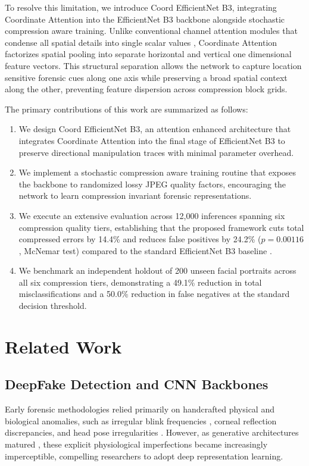 \documentclass[conference]{IEEEtran}
\begin{document}
To resolve this limitation, we introduce Coord EfficientNet B3, integrating Coordinate Attention \cite{hou2021coordinate} into the EfficientNet B3 backbone alongside stochastic compression aware training. Unlike conventional channel attention modules that condense all spatial details into single scalar values \cite{hu2018squeeze}, Coordinate Attention factorizes spatial pooling into separate horizontal and vertical one dimensional feature vectors. This structural separation allows the network to capture location sensitive forensic cues along one axis while preserving a broad spatial context along the other, preventing feature dispersion across compression block grids.

The primary contributions of this work are summarized as follows:
\begin{enumerate}
    \item We design Coord EfficientNet B3, an attention enhanced architecture that integrates Coordinate Attention into the final stage of EfficientNet B3 to preserve directional manipulation traces with minimal parameter overhead.
    \item We implement a stochastic compression aware training routine that exposes the backbone to randomized lossy JPEG quality factors, encouraging the network to learn compression invariant forensic representations.
    \item We execute an extensive evaluation across 12,000 inferences spanning six compression quality tiers, establishing that the proposed framework cuts total compressed errors by 14.4\% and reduces false positives by 24.2\% ($p = 0.00116$, McNemar test) compared to the standard EfficientNet B3 baseline \cite{deepa2026enhanced}.
    \item We benchmark an independent holdout of 200 unseen facial portraits across all six compression tiers, demonstrating a 49.1\% reduction in total misclassifications and a 50.0\% reduction in false negatives at the standard decision threshold.
\end{enumerate}

\section{Related Work}

\subsection{DeepFake Detection and CNN Backbones}
Early forensic methodologies relied primarily on handcrafted physical and biological anomalies, such as irregular blink frequencies \cite{li2018ictu}, corneal reflection discrepancies, and head pose irregularities \cite{mirsky2021creation}. However, as generative architectures matured \cite{karras2019style}, these explicit physiological imperfections became increasingly imperceptible, compelling researchers to adopt deep representation learning.
\end{document}

